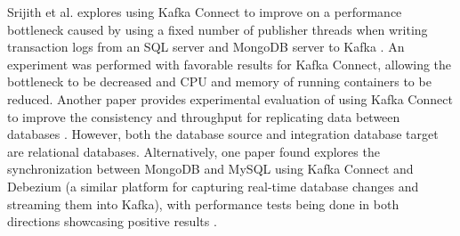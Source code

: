 Srijith et al. explores using Kafka Connect to improve on a performance bottleneck caused by using a fixed number of publisher threads when writing transaction logs from an SQL server and MongoDB server to Kafka \cite{srijithkafkaconnectperformance}. An experiment was performed with favorable results for Kafka Connect, allowing the bottleneck to be decreased and CPU and memory of running containers to be reduced. Another paper provides experimental evaluation of using Kafka Connect to improve the consistency and throughput for replicating data between databases \cite{adilaoptimizationkafkaconnect}. However, both the database source and integration database target are relational databases. Alternatively, one paper found explores the synchronization between MongoDB and MySQL using Kafka Connect and Debezium (a similar platform for capturing real-time database changes and streaming them into Kafka), with performance tests being done in both directions showcasing positive results \cite{sqlmongosync}.

